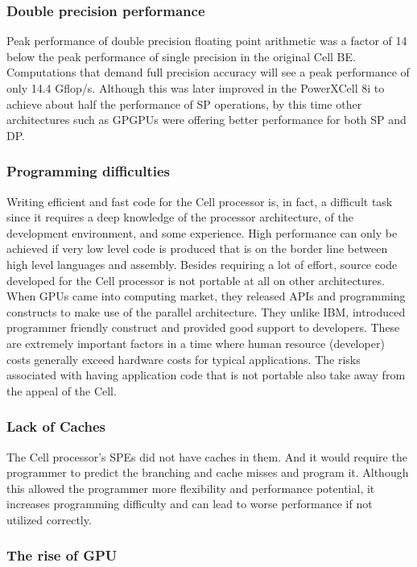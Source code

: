 \documentclass{sig-alternate-05-2015}
\begin{document}
\subsubsection{Double precision performance} 

Peak performance of double precision floating point arithmetic was a factor of 14 below the peak performance of single precision in the original Cell BE. Computations that demand full precision accuracy will see a peak performance of only 14.4 Gflop/s. Although this was later improved in the PowerXCell 8i to achieve about half the performance of SP operations, by this time other architectures such as GPGPUs were offering better performance for both SP and DP.
 
\subsubsection{Programming difficulties}

Writing efficient and fast code for the Cell processor is, in fact, a difficult task since it requires a deep knowledge of the processor architecture, of the development environment, and some experience. High performance can only be achieved if very low level code is produced that is on the border line between high level languages and assembly. Besides requiring a lot of effort, source code developed for the Cell processor is not portable at all on other architectures. When GPUs came into computing market, they released APIs and programming constructs to make use of the parallel architecture. They unlike IBM, introduced programmer friendly construct and provided good support to developers. These are extremely important factors in a time where human resource (developer) costs generally exceed hardware costs for typical applications. The risks associated with having application code that is not portable also take away from the appeal of the Cell.  

\subsubsection{Lack of Caches} 
The Cell processor’s SPEs did not have caches in them. And it would require the programmer to predict the branching and cache misses and program it. Although this allowed the programmer more flexibility and performance potential, it increases programming difficulty and can lead to worse performance if not utilized correctly. 

\subsubsection{The rise of GPU}
\end{document}
